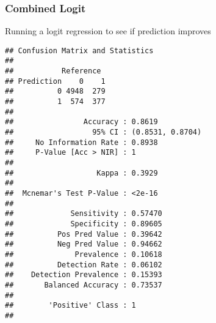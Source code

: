 \documentclass[
]{article}
\newenvironment{Shaded}{\begin{snugshade}}{\end{snugshade}}
\newcommand{\AttributeTok}[1]{\textcolor[rgb]{0.77,0.63,0.00}{#1}}
\newcommand{\DecValTok}[1]{\textcolor[rgb]{0.00,0.00,0.81}{#1}}
\newcommand{\FunctionTok}[1]{\textcolor[rgb]{0.00,0.00,0.00}{#1}}
\newcommand{\NormalTok}[1]{#1}
\newcommand{\OtherTok}[1]{\textcolor[rgb]{0.56,0.35,0.01}{#1}}
\newcommand{\SpecialCharTok}[1]{\textcolor[rgb]{0.00,0.00,0.00}{#1}}
\newcommand{\StringTok}[1]{\textcolor[rgb]{0.31,0.60,0.02}{#1}}
\begin{document}
\hypertarget{combined-logit}{%
\subsubsection{Combined Logit}\label{combined-logit}}

Running a logit regression to see if prediction improves

\begin{Shaded}
\end{Shaded}

\begin{verbatim}
## Confusion Matrix and Statistics
## 
##           Reference
## Prediction    0    1
##          0 4948  279
##          1  574  377
##                                           
##                Accuracy : 0.8619          
##                  95% CI : (0.8531, 0.8704)
##     No Information Rate : 0.8938          
##     P-Value [Acc > NIR] : 1               
##                                           
##                   Kappa : 0.3929          
##                                           
##  Mcnemar's Test P-Value : <2e-16          
##                                           
##             Sensitivity : 0.57470         
##             Specificity : 0.89605         
##          Pos Pred Value : 0.39642         
##          Neg Pred Value : 0.94662         
##              Prevalence : 0.10618         
##          Detection Rate : 0.06102         
##    Detection Prevalence : 0.15393         
##       Balanced Accuracy : 0.73537         
##                                           
##        'Positive' Class : 1               
## 
\end{verbatim}
\end{document}
